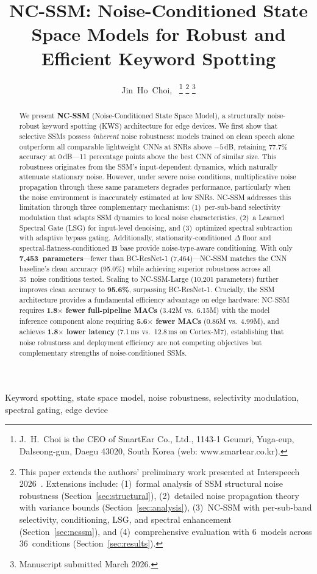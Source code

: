 \documentclass[journal]{IEEEtran}
\title{NC-SSM: Noise-Conditioned State Space Models for Robust and Efficient Keyword Spotting}
\author{Jin~Ho~Choi,~\IEEEmembership{Member,~IEEE}%
\thanks{J.~H.~Choi is the CEO of SmartEar Co., Ltd., 1143-1 Geumri, Yuga-eup, Dalseong-gun, Daegu 43020, South Korea (web: www.smartear.co.kr).}%
\thanks{This paper extends the authors' preliminary work presented at Interspeech 2026~\cite{choi2026nanomamba_interspeech}. Extensions include: (1)~formal analysis of SSM structural noise robustness (Section~\ref{sec:structural}), (2)~detailed noise propagation theory with variance bounds (Section~\ref{sec:analysis}), (3)~NC-SSM with per-sub-band selectivity, conditioning, LSG, and spectral enhancement (Section~\ref{sec:ncssm}), and (4)~comprehensive evaluation with 6~models across 36~conditions (Section~\ref{sec:results}).}%
\thanks{Manuscript submitted March 2026.}}
\begin{document}
\maketitle

\begin{abstract}
We present \textbf{NC-SSM} (Noise-Conditioned State Space Model), a structurally noise-robust keyword spotting (KWS) architecture for edge devices.
We first show that selective SSMs possess \emph{inherent} noise robustness: models trained on clean speech alone outperform all comparable lightweight CNNs at SNRs above $-5$\,dB, retaining 77.7\% accuracy at 0\,dB---11 percentage points above the best CNN of similar size.
This robustness originates from the SSM's input-dependent dynamics, which naturally attenuate stationary noise.
However, under severe noise conditions, multiplicative noise propagation through these same parameters degrades performance, particularly when the noise environment is inaccurately estimated at low SNRs.
NC-SSM addresses this limitation through three complementary mechanisms: (1)~per-sub-band selectivity modulation that adapts SSM dynamics to local noise characteristics, (2)~a Learned Spectral Gate (LSG) for input-level denoising, and (3)~optimized spectral subtraction with adaptive bypass gating.
Additionally, stationarity-conditioned $\Delta$ floor and spectral-flatness-conditioned $\mathbf{B}$ base provide noise-type-aware conditioning.
With only \textbf{7{,}453~parameters}---fewer than BC-ResNet-1 (7{,}464)---NC-SSM matches the CNN baseline's clean accuracy (95.0\%) while achieving superior robustness across all 35~noise conditions tested.
Scaling to NC-SSM-Large (10{,}201 parameters) further improves clean accuracy to \textbf{95.6\%}, surpassing BC-ResNet-1.
Crucially, the SSM architecture provides a fundamental efficiency advantage on edge hardware: NC-SSM requires \textbf{1.8$\times$ fewer full-pipeline MACs} (3.42M vs.\ 6.15M) with the model inference component alone requiring \textbf{5.6$\times$ fewer MACs} (0.86M vs.\ 4.99M), and achieves \textbf{1.8$\times$ lower latency} (7.1\,ms vs.\ 12.8\,ms on Cortex-M7), establishing that noise robustness and deployment efficiency are not competing objectives but complementary strengths of noise-conditioned SSMs.
\end{abstract}

\begin{IEEEkeywords}
Keyword spotting, state space model, noise robustness, selectivity modulation, spectral gating, edge device
\end{IEEEkeywords}
\end{document}
